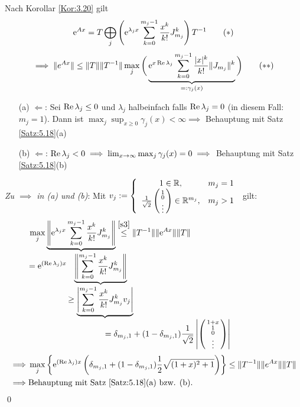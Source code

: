 \documentclass[a4paper]{article}
\begin{document}
\begin{Beweis}
Nach Korollar \ref{Kor:3.20} gilt
\[\mathrm{e}^{Ax}=T\bigoplus_j\left(\mathrm{e}^{\lambda_jx}\sum_{k=0}^{m_j-1}\frac{x^k}{k!}J_{m_j}^k\right)T^{-1}\tag{$*$}\label{s3}\]
\[\implies \|e^{Ax}\|\le \|T\|\|T^{-1}\|\max_j\bigg(\underbrace{\mathrm{e}^{x\operatorname{\textrm{Re}}\lambda_j}\sum_{k=0}^{m_j-1}\frac{|x|^k}{k!}\|J_{m_j}\|^k}_{=:\gamma_j(x)}\bigg)\tag{$**$}\label{s4}\]
\begin{itemize}
\item[(a)] \glqq$\Longleftarrow$\grqq: Sei $\operatorname{\textrm{Re}} \lambda_j\le 0$ und $\lambda_j$ halbeinfach falls $\operatorname{\textrm{Re}} \lambda_j=0$ (in diesem Fall:$m_j=1$). Dann ist $\max_j\sup_{x\ge0}\gamma_j(x)<\infty\implies$ Behauptung mit Satz \ref{Satz:5.18}(a)
\item[(b)]\glqq $\Longleftarrow$\grqq: $\operatorname{\textrm{Re}}\lambda_j<0\implies \lim_{x\to\infty}\max_j\gamma_j(x)=0\implies$ Behauptung mit Satz \ref{Satz:5.18}(b)
\end{itemize}
\textit{Zu \glqq $\implies$\grqq{} in (a) und (b)}: Mit $v_j:=\left\{ \begin{array}{cc}
1\in\mathbb R,&m_j=1\\
\frac{1}{\sqrt{2}}\left(\begin{smallmatrix}\\1\\0\\\vdots\end{smallmatrix}\right)\in\mathbb R^{m_j},&m_j>1
\end{array}\right. $ gilt:
\begin{align*}
&\max_j
\underbrace{
\left\|\e^{\lambda_jx}\sum_{k=0}^{m_j-1}\frac{x^k}{k!}J_{m_j}^k\right\|
}_{\mathclap{
\displaystyle=\e^{(\Rea\lambda_j)x}
\underbrace{
\left\|\sum_{k=0}^{m_j-1}\frac{x^k}{k!}J_{m_j}^k\right\|
}_{
\displaystyle\ge
\underbrace{\left|\sum_{k=0}^{m_j-1}\frac{x^k}{k!}J_{m_j}^kv_j\right|
}_{
\mathrlap{\displaystyle=\delta_{m_j,1}+(1-\delta_{m_j,1})\frac{1}{\sqrt{2}}\left|\left(\begin{smallmatrix}1+x\\1\\0\\\vdots\end{smallmatrix}\right)\right|}
}
}
}}
\overset{\eqref{s3}}{\le }\|T^{-1}\|\|\e^{Ax}\|\|T\|\\
\implies &\max_j\left\{\e^{(\Rea\lambda_j)x}\left(\delta_{m_j,1}+(1-\delta_{m_j,1})\frac{1}{2}\sqrt{(1+x)^2+1}\right)\right\}\le \|T^{-1}\|\|e^{Ax}\|\|T\|\\
\implies & \text{Behauptung mit Satz \ref{Satz:5.18}(a) bzw. (b).}
\end{align*}\qed
\end{Beweis}
\end{document}
